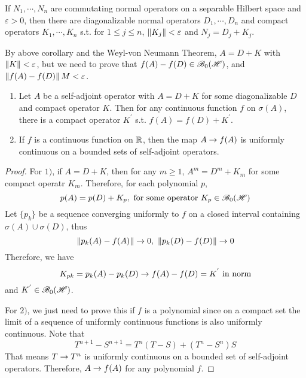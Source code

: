 \documentclass[a4paper,11pt]{report}
\begin{document}
\begin{thm}
	If $N_1, \cdots, N_n$ are commutating normal operators on a separable Hilbert space and $\varepsilon > 0$, then there are diagonalizable normal operators $D_1,\cdots,D_n$ and compact operators $K_1,\cdots,K_n$ s.t. for $1 \leqslant j \leqslant n$, $\left\lVert K_j\right\lVert < \varepsilon$ and $N_j = D_j + K_j$.
\end{thm}

By above corollary and the Weyl-von Neumann Theorem, $A = D + K$ with $\left\lVert K\right\lVert < \varepsilon$, but we need to prove that $f(A) - f(D) \in \mathscr{B}_{0}\mathscr{(H)}$, and $\left\lVert f(A) - f(D)\right\lVert M< \varepsilon$.

\begin{lem}
	\begin{enumerate}[label=\arabic*)]
		\item Let $A$ be a self-adjoint operator with $A = D + K$ for some diagonalizable $D$ and compact operator $K$. Then for any continuous function $f$ on $\sigma(A)$, there is a compact operator $K^{'}$ s.t. $f(A) = f(D) + K^{'}$.
		\item If $f$ is a continuous function on $\mathbb{R}$, then the map $A \rightarrow f(A)$ is uniformly continuous on a bounded sets of self-adjoint operators.
	\end{enumerate}
\end{lem}
\begin{proof}
	For $1)$, if $A = D + K$, then for any $m \geqslant 1$, $A^m = D^m + K_m$ for some compact operatr $K_m$. Therefore, for each polynomial $p$, 
	\begin{equation*}
		p(A) = p(D) + K_p, \text{ for some operator } K_p \in \mathscr{B}_{0}\mathscr{(H)}
	\end{equation*}
	Let $\{p_k\}$ be a sequence converging uniformly to $f$ on a closed interval containing $\sigma(A) \cup \sigma(D)$, thus
	\begin{equation*}
		\left\lVert p_k(A) - f(A)\right\lVert \rightarrow 0,~ \left\lVert p_k(D) - f(D)\right\lVert \rightarrow 0
	\end{equation*}
	Therefore, we have
	\begin{equation*}
		K_{pk} = p_k(A) - p_k(D) \rightarrow f(A) - f(D) = K^{'} \text{ in norm}
	\end{equation*}
	and $K^{'} \in \mathscr{B}_{0}\mathscr{(H)}$.
	\item For $2)$, we just need to prove this if $f$ is a polynomial since on a compact set the limit of a sequence of uniformly continuous functions is also uniformly continuous. Note that
	\begin{equation*}
		T^{n+1} - S^{n+1} = T^n(T-S) + (T^n - S^n)S
	\end{equation*}
	That means $T \rightarrow T^n$ is uniformly continuous on a bounded set of self-adjoint operators. Therefore, $A \rightarrow f(A)$ for any polynomial $f$.
\end{proof}
\end{document}
